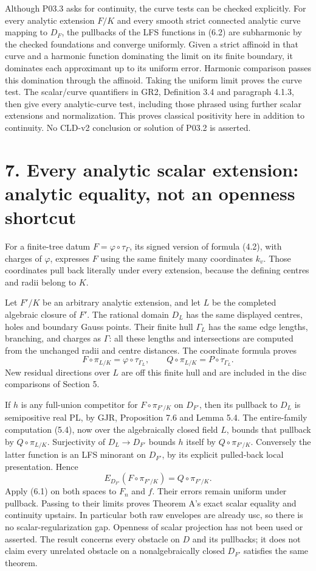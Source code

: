 \documentclass[11pt]{article}
\begin{document}
Although P03.3 asks for continuity, the curve tests can be checked explicitly. For every analytic extension \(F/K\) and every smooth strict connected analytic curve mapping to \(D_F\), the pullbacks of the LFS functions in (6.2) are subharmonic by the checked foundations and converge uniformly. Given a strict affinoid in that curve and a harmonic function dominating the limit on its finite boundary, it dominates each approximant up to its uniform error. Harmonic comparison passes this domination through the affinoid. Taking the uniform limit proves the curve test. The scalar/curve quantifiers in GR2, Definition 3.4 and paragraph 4.1.3, then give every analytic-curve test, including those phrased using further scalar extensions and normalization. This proves classical positivity here in addition to continuity. No CLD-v2 conclusion or solution of P03.2 is asserted.

\section*{7. Every analytic scalar extension: analytic equality, not an openness shortcut}

For a finite-tree datum \(F=\varphi\circ\tau_\Gamma\), its signed version of formula (4.2), with charges of \(\varphi\), expresses \(F\) using the same finitely many coordinates \(k_v\). Those coordinates pull back literally under every extension, because the defining centres and radii belong to \(K\).

Let \(F'/K\) be an arbitrary analytic extension, and let \(L\) be the completed algebraic closure of \(F'\). The rational domain \(D_L\) has the same displayed centres, holes and boundary Gauss points. Their finite hull \(\Gamma_L\) has the same edge lengths, branching, and charges as \(\Gamma\): all these lengths and intersections are computed from the unchanged radii and centre distances. The coordinate formula proves
\[
F\circ\pi_{L/K}=\varphi\circ\tau_{\Gamma_L},\qquad
Q\circ\pi_{L/K}=P\circ\tau_{\Gamma_L}.
\]
New residual directions over \(L\) are off this finite hull and are included in the disc comparisons of Section 5.

If \(h\) is any full-union competitor for \(F\circ\pi_{F'/K}\) on \(D_{F'}\), then its pullback to \(D_L\) is semipositive real PL, by GJR, Proposition 7.6 and Lemma 5.4. The entire-family computation (5.4), now over the algebraically closed field \(L\), bounds that pullback by \(Q\circ\pi_{L/K}\). Surjectivity of \(D_L\to D_{F'}\) bounds \(h\) itself by \(Q\circ\pi_{F'/K}\). Conversely the latter function is an LFS minorant on \(D_{F'}\), by its explicit pulled-back local presentation. Hence
\[
E_{D_{F'}}(F\circ\pi_{F'/K})=Q\circ\pi_{F'/K}.
\tag{7.1}
\]
Apply (6.1) on both spaces to \(F_n\) and \(f\). Their errors remain uniform under pullback. Passing to their limits proves Theorem A's exact scalar equality and continuity upstairs. In particular both raw envelopes are already usc, so there is no scalar-regularization gap. Openness of scalar projection has not been used or asserted. The result concerns every obstacle on \(D\) and its pullbacks; it does not claim every unrelated obstacle on a nonalgebraically closed \(D_{F'}\) satisfies the same theorem.
\end{document}
